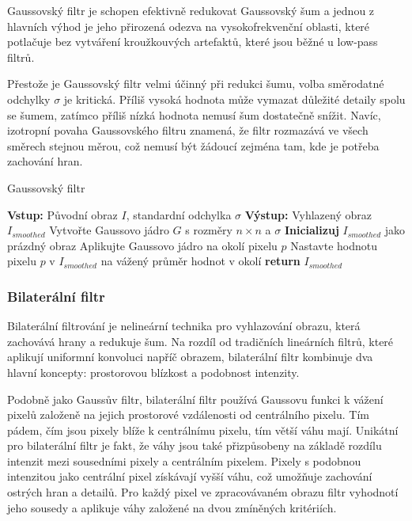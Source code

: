 \documentclass[male,czech,api_ing]{thesis}
\begin{document}
Gaussovský filtr je schopen efektivně redukovat Gaussovský šum a jednou z hlavních výhod je jeho přirozená odezva na vysokofrekvenční oblasti, které potlačuje bez vytváření kroužkouvých artefaktů, které jsou běžné u low-pass filtrů.

Přestože je Gaussovský filtr velmi účinný při redukci šumu, volba směrodatné odchylky $\sigma$ je kritická. Příliš vysoká hodnota může vymazat důležité detaily spolu se šumem, zatímco příliš nízká hodnota nemusí šum dostatečně snížit. Navíc, izotropní povaha Gaussovského filtru znamená, že filtr rozmazává ve všech směrech stejnou měrou, což nemusí být žádoucí zejména tam, kde je potřeba zachování hran. \cite{XRayImageProcessing}

\begin{algorithm}
    \caption{Gaussovský filtr}
    \begin{algorithmic}[1]
        \State \textbf{Vstup:} Původní obraz $I$, standardní odchylka $\sigma$
        \State \textbf{Výstup:} Vyhlazený obraz $I_{smoothed}$
        \State Vytvořte Gaussovo jádro $G$ s rozměry $n \times n$ a $\sigma$
        \State \textbf{Inicializuj} $I_{smoothed}$ jako prázdný obraz
            \State Aplikujte Gaussovo jádro na okolí pixelu $p$
            \State Nastavte hodnotu pixelu $p$ v $I_{smoothed}$ na vážený průměr hodnot v okolí
        \EndFor
        \State \textbf{return} $I_{smoothed}$
    \end{algorithmic}
\end{algorithm}

\subsubsection{Bilaterální filtr}
Bilaterální filtrování je nelineární technika pro vyhlazování obrazu, která zachovává hrany a redukuje šum. Na rozdíl od tradičních lineárních filtrů, které aplikují uniformní konvoluci napříč obrazem, bilaterální filtr kombinuje dva hlavní koncepty: prostorovou blízkost a podobnost intenzity. 

Podobně jako Gaussův filtr, bilaterální filtr používá Gaussovu funkci k vážení pixelů založeně na jejich prostorové vzdálenosti od centrálního pixelu. Tím pádem, čím jsou pixely blíže k centrálnímu pixelu, tím větší váhu mají. Unikátní pro bilaterální filtr je fakt, že váhy jsou také přizpůsobeny na základě rozdílu intenzit mezi sousedními pixely a centrálním pixelem. Pixely s podobnou intenzitou jako centrální pixel získávají vyšší váhu, což umožňuje zachování ostrých hran a detailů. Pro každý pixel ve zpracovávaném obrazu filtr vyhodnotí jeho sousedy a aplikuje váhy založené na dvou zmíněných kritériích.\cite{BilateralFilter}
\end{document}
